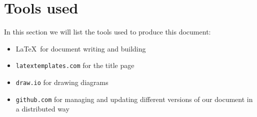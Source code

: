 \documentclass[../DD0.tex]{subfiles}
\begin{document}
\section*{Tools used}
\label{sec:tools}

  In this section we will list the tools used to produce this document:
  \begin{itemize}
    \item \LaTeX\ for document writing and building

    \item \texttt{latextemplates.com} for the title page

    \item \texttt{draw.io} for drawing diagrams
    
    \item \texttt{github.com} for managing and updating different versions of our document in a distributed way

  \end{itemize}
\end{document}
